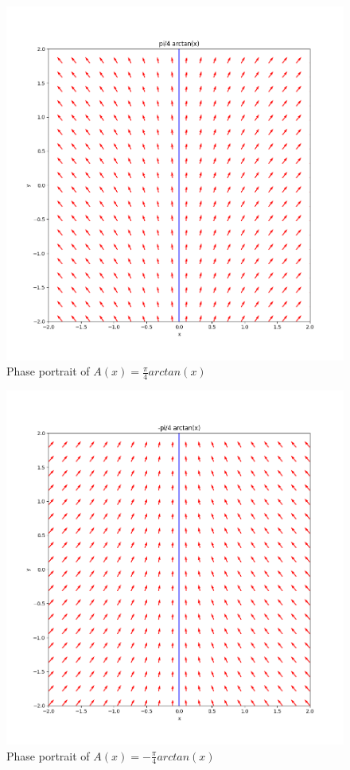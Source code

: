 \documentclass[11pt]{article}
\begin{document}
\begin{figure}[h!]
    \centering
    \includegraphics{phase10.png}
    \caption{Phase portrait of $A(x) = \frac{\pi}{4}arctan(x)$}
    \label{fig:phase10}
\end{figure}

\begin{figure}[h!]
    \centering
    \includegraphics{phase11.png}
    \caption{Phase portrait of $A(x) = -\frac{\pi}{4}arctan(x)$}
    \label{fig:phase11}
\end{figure}
\end{document}
